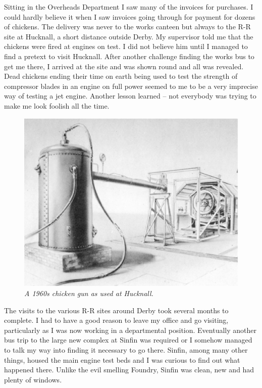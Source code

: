 Sitting in the Overheads Department I saw many of the invoices for
purchases. I could hardly believe it when I saw invoices going through
for payment for dozens of chickens. The delivery was never to the
works canteen but always to the R-R site at Hucknall, a short distance
outside Derby. My supervisor told me that the chickens were fired at
engines on test. I did not believe him until I managed to find a
pretext to visit Hucknall. After another challenge finding the works
bus to get me there, I arrived at the site and was shown round and all
was revealed. Dead chickens ending their time on earth being used to
test the strength of compressor blades in an engine on full power
seemed to me to be a very imprecise way of testing a jet
engine. Another lesson learned -- not everybody was trying to make me
look foolish all the time.

\begin{figure}[htbp]
   \vspace{2em}
   \centering
   \includegraphics[scale=0.5]{bird_gun.eps}
   \caption*{\small \em A 1960s chicken gun as used at Hucknall.}
   \label{fig:birdgun}
\end{figure}

The visits to the various R-R sites around Derby took several months
to complete. I had to have a good reason to leave my office and go
visiting, particularly as I was now working in a departmental
position. Eventually another bus trip to the large new complex at
Sinfin was required or I somehow managed to talk my way into finding
it necessary to go there. Sinfin, among many other things, housed the
main engine test beds and I was curious to find out what happened
there. Unlike the evil smelling Foundry, Sinfin was clean, new and had
plenty of windows.

